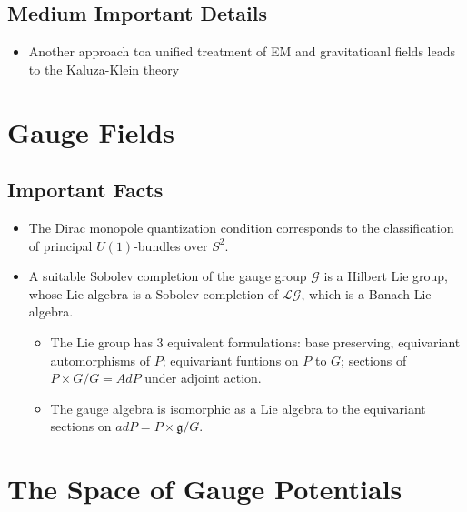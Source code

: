\documentclass[12pt]{report}
\begin{document}
\subsection{Medium Important Details}
\begin{itemize}
    \item Another approach toa  unified treatment of EM and gravitatioanl fields leads to the Kaluza-Klein theory
\end{itemize}
\section{Gauge Fields}

\subsection{Important Facts}
\begin{itemize}
    \item The Dirac monopole quantization condition corresponds to the classification of principal $U(1)$-bundles over $S^2$.
    
    \item A suitable Sobolev completion of the gauge group $\mathcal G$ is a Hilbert Lie group, whose Lie algebra is a Sobolev completion of $\mathcal{LG}$, which is a Banach Lie algebra.
    \begin{itemize}
        \item The Lie group has $3$ equivalent formulations: base preserving, equivariant automorphisms of $P$; equivariant funtions on $P$ to $G$; sections of $P \times G / G = Ad P$ under adjoint action.
        
        \item The gauge algebra is isomorphic as a Lie algebra to the equivariant sections on $ad P = P \times \mathfrak g / G$.
    \end{itemize}
\end{itemize}

\section{The Space of Gauge Potentials}

\end{document}

